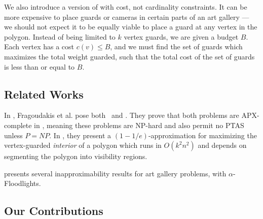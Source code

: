 We also introduce a version of \MVVG{} with cost, not cardinality constraints. It can be more expensive to place guards or cameras in certain parts of an art gallery --- we should not expect it to be equally viable to place a guard at any vertex in the polygon. Instead of being limited to $k$ vertex guards, we are given a budget $B$. Each vertex has a cost $c(v)\leq B$, and we must find the set of guards which maximizes the total weight guarded, such that the total cost of the set of guards is less than or equal to $B$.


\subsection{Related Works}
In \cite{fragoudakis-interior,fragoudakis-boundary,fragoudakis-paintings}, Fragoudakis et al. pose both \MLVG\ and \MVVG. They prove that both problems are APX-complete in \cite{fragoudakis-boundary}, meaning these problems are NP-hard and also permit no PTAS unless $P=NP$. In \cite{fragoudakis-interior}, they present a $(1-1/e)$-approximation for maximizing the vertex-guarded \emph{interior} of a polygon which runs in $O(k^2n^2)$ and depends on segmenting the polygon into visibility regions.

\cite{abdelkader} presents several inapproximability results for art gallery problems, with $\alpha$-Floodlights.


\cite{bukov}

\subsection{Our Contributions}

